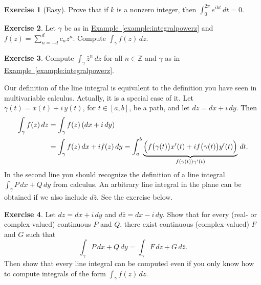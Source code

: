 \documentclass[12pt,openany]{book}
\newcommand{\glsadd}[2][]{}
\newcommand{\Z}{{\mathbb{Z}}}
\theoremstyle{plain}
\theoremstyle{remark}
\theoremstyle{definition}
\newenvironment{exbox}{%
    \def\FrameCommand{\vrule width 1pt \relax\hspace{10pt}}%
    \MakeFramed{\advance\hsize-\width\FrameRestore}%
}{%
    \endMakeFramed
}
\theoremstyle{exercise}
\newtheorem{exercise}{Exercise}[section]
\theoremstyle{example}
\newcommand{\exampleref}[1]{\hyperref[#1]{Example~\ref*{#1}}}
\begin{document}
\begin{exbox}
\begin{exercise}[Easy]
Prove that if $k$ is a nonzero integer, then $\int_0^{2\pi} e^{ik t} \, dt = 0$.
\end{exercise}

\begin{exercise}
Let $\gamma$ be as in \exampleref{example:integralpowerz}
and 
$f(z) = \sum_{n=-d}^d c_n z^n$.
Compute $\int_\gamma f(z) \, dz$.
\end{exercise}

\begin{exercise}
Compute $\int_\gamma \bar{z}^n \, dz$ for all $n \in \Z$ and $\gamma$ as in
\exampleref{example:integralpowerz}.
\end{exercise}
\end{exbox}

Our definition of the line integral is equivalent to the definition you
have seen in multivariable calculus.  Actually, it is a special case of it.
Let $\gamma(t) = x(t) +i \, y(t)$, for $t \in [a,b]$, be a path,
and let $dz = dx + i\, dy$.
Then
\begin{equation*}
\begin{split}
\int_{\gamma} f(z) \, dz
& =
\int_{\gamma} f(z) \, (dx + i\, dy)
\\
& =
\int_{\gamma} f(z) \, dx + i f(z) \, dy
=
\int_a^b \underbrace{\Bigl( f\bigl(\gamma(t)\bigr) x'(t) + i f\bigl(\gamma(t)\bigr) y'(t) \Bigr)}_{f(\gamma(t)) \gamma'(t)} \, dt .
\end{split}
\end{equation*}
In the second line you should recognize the definition of a line integral
$\int_\gamma P\,dx + Q \, dy$ from calculus.  An arbitrary
line integral in the plane can be obtained if we also include $d\bar{z}$.  See the
exercise below.

\begin{exbox}
\begin{exercise} \label{exercise:realpathintegral}
\glsadd{not:dz}\glsadd{not:dzbar}%
Let $dz = dx + i \, dy$ and 
$d\bar{z} = dx - i \, dy$.  Show that for every (real- or complex-valued) continuous $P$ and $Q$,
there exist continuous (complex-valued) $F$ and $G$ such that
\begin{equation*}
\int_{\gamma} P \, dx + Q \, dy
=
\int_{\gamma} F \, dz + G \, d\bar{z} .
\end{equation*}
Then show that every line integral
can be computed even if you only know how to compute integrals of the form
$\int_\gamma f(z) \, dz$.
\end{exercise}
\end{exbox}
\end{document}
